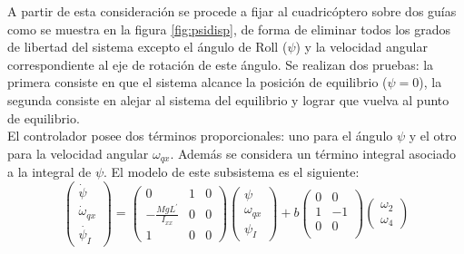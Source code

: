 \documentclass[main]{subfiles}
\begin{document}
A partir de esta consideraci\'on se procede a fijar al cuadric\'optero sobre dos gu\'ias como se muestra en la figura \ref{fig:psidisp}, de forma de eliminar todos los grados de libertad del sistema excepto el \'angulo de Roll ($\psi$) y la velocidad angular correspondiente al eje de rotaci\'on de este ángulo. Se realizan dos pruebas: la primera consiste en que el sistema alcance la posici\'on de equilibrio ($\psi = 0$), la segunda consiste en alejar al sistema del equilibrio y lograr que vuelva al punto de equilibrio.\\

El controlador posee dos términos proporcionales: uno para el \'angulo $\psi$ y el otro para la velocidad angular $\omega_{qx}$. Además se considera un t\'ermino integral asociado a la integral de $\psi$. El modelo de este subsistema es el siguiente:
\begin{equation}
\left(\begin{array}{c}
\dot{\psi}\\
\dot{\omega}_{qx}\\
\dot{\psi_I}
\end{array}\right) = \left(\begin{array}{ccc}
0 & 1 & 0\\
-\frac{MgL^\prime}{I_{xx}} & 0 & 0\\
1 & 0 &0
\end{array}\right) 
\left(\begin{array}{c}
{\psi}\\
{\omega}_{qx}\\
{\psi_I}
\end{array}\right)
+ b\left(\begin{array}{cc}
0 & 0\\
1 & -1\\
0 & 0\\
\end{array}\right) \left(\begin{array}{c}
\omega_2 \\
\omega_4
\end{array}\right)
\end{equation}
\end{document}
